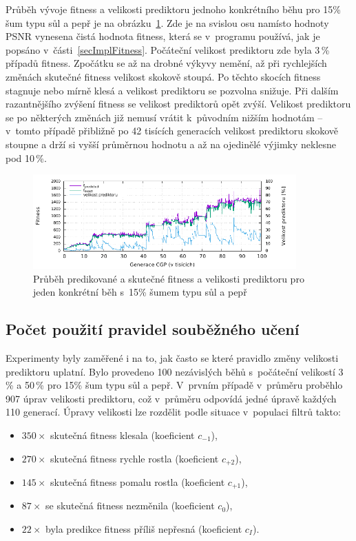 Průběh vývoje fitness a velikosti prediktoru jednoho konkrétního běhu pro 15\% šum typu sůl a pepř je na obrázku~\ref{plotFitPred}. Zde je na svislou osu namísto hodnoty PSNR vynesena čistá hodnota fitness, která se v~programu používá, jak je popsáno v~části~\ref{secImplFitness}. Počáteční velikost prediktoru zde byla 3\,\% případů fitness. Zpočátku se až na drobné výkyvy nemění, až při rychlejších změnách skutečné fitness velikost skokově stoupá. Po těchto skocích fitness stagnuje nebo mírně klesá a velikost prediktoru se pozvolna snižuje. Při dalším razantnějšího zvýšení fitness se velikost prediktorů opět zvýší. Velikost prediktoru se po některých změnách již nemusí vrátit k~původním nižším hodnotám -- v~tomto případě přibližně po 42 tisících generacích velikost prediktoru skokově stoupne a drží si vyšší průměrnou hodnotu a až na ojedinělé výjimky neklesne pod 10\,\%.

\begin{figure}[htb]
    \centering
    \includegraphics[width=0.9\textwidth]{fig/plot/run-fitpred1.pdf}
    \caption{Průběh predikované a skutečné fitness a velikosti prediktoru pro jeden konkrétní běh s~15\% šumem typu sůl a pepř}
    \label{plotFitPred}
\end{figure}

\subsection{Počet použití pravidel souběžného učení}

Experimenty byly zaměřené i na to, jak často se které pravidlo změny velikosti prediktoru uplatní. Bylo provedeno 100 nezávislých běhů s~počáteční velikostí 3\,\% a 50\,\% pro 15\% šum typu sůl a pepř. V~prvním případě v~průměru proběhlo 907 úprav velikosti prediktoru, což v~průměru odpovídá jedné úpravě každých 110 generací. Úpravy velikosti lze rozdělit podle situace v~populaci filtrů takto:

\begin{itemize}
    \item $350\times$ skutečná fitness klesala (koeficient $c_{-1}$),
    \item $270\times$ skutečná fitness rychle rostla (koeficient $c_{+2}$),
    \item $145\times$ skutečná fitness pomalu rostla (koeficient $c_{+1}$),
    \item $87\times$ se skutečná fitness nezměnila (koeficient $c_{0}$),
    \item $22\times$ byla predikce fitness příliš nepřesná (koeficient $c_{I}$).
\end{itemize}

